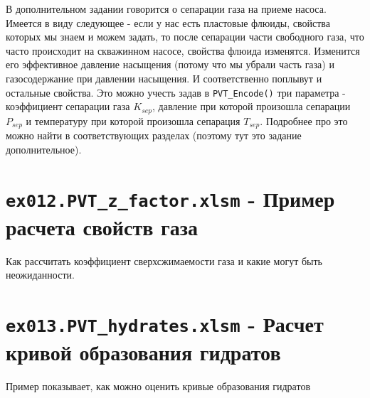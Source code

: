 В дополнительном задании говорится о сепарации газа на приеме насоса. Имеется в виду следующее - если у нас есть пластовые флюиды, свойства которых мы знаем и можем задать, то после сепарации части свободного газа, что часто происходит на скважинном насосе, свойства флюида изменятся. Изменится его эффективное давление насыщения (потому что мы убрали часть газа) и газосодержание при давлении насыщения. И соответственно поплывут и остальные свойства. Это можно учесть задав в \texttt{PVT_Encode()} три параметра - коэффициент сепарации газа $K_{sep}$, давление при которой произошла сепарации $P_{sep}$ и температуру при которой произошла сепарация $T_{sep}$. Подробнее про это можно найти в соответствующих разделах (поэтому тут это задание дополнительное).

\section{\texttt{ex012.PVT\_z\_factor.xlsm} - Пример расчета свойств газа}

Как рассчитать коэффициент сверхсжимаемости газа и какие могут быть неожиданности. 

\section{\texttt{ex013.PVT\_hydrates.xlsm} - Расчет кривой образования гидратов}

Пример показывает, как можно оценить кривые образования гидратов

